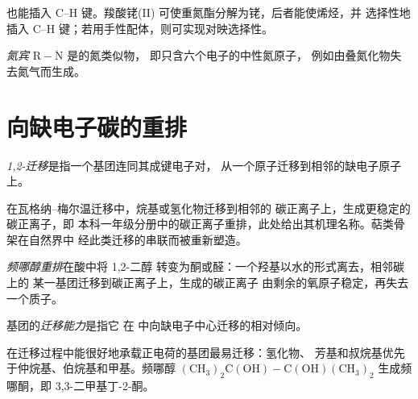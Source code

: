 也能插入 C--H 键。羧酸铑(II)
可使重氮酯分解为铑，后者能使烯烃，并
选择性地插入 C--H 键；若用手性配体，则可实现对映选择性。

\begin{definition}[氮宾]\label{def:b3:radicals-carbenes:nitrene}
\emph{氮宾} $\mathrm{R{-}\ddot N}$ 是的氮类似物，
即只含六个电子的中性氮原子，
例如由叠氮化物失去氮气而生成。
\end{definition}

\section{向缺电子碳的重排}

\begin{definition}[1,2-迁移]\label{def:b3:radicals-carbenes:shift}
\emph{1,2-迁移}是指一个基团连同其成键电子对，
从一个原子迁移到相邻的缺电子原子上。
\end{definition}

在瓦格纳–梅尔温迁移中，烷基或氢化物迁移到相邻的
碳正离子上，生成更稳定的碳正离子，即
本科一年级分册中的碳正离子重排，此处给出其机理名称。萜类骨架在自然界中
经此类迁移的串联而被重新塑造。

\begin{definition}[频哪醇重排]\label{def:b3:radicals-carbenes:pinacol}
\emph{频哪醇重排}在酸中将 1,2-二醇
转变为酮或醛：一个羟基以水的形式离去，相邻碳上的
某一基团迁移到碳正离子上，生成的碳正离子
由剩余的氧原子稳定，再失去一个质子。
\end{definition}

\begin{definition}[迁移能力]\label{def:b3:radicals-carbenes:migratory}
基团的\emph{迁移能力}是指它
在 中向缺电子中心迁移的相对倾向。
\end{definition}

在迁移过程中能很好地承载正电荷的基团最易迁移：氢化物、
芳基和叔烷基优先于仲烷基、伯烷基和甲基。频哪醇
$\mathrm{(CH_3)_2C(OH){-}C(OH)(CH_3)_2}$ 生成频哪酮，即 3,3-二甲基丁-2-酮。

